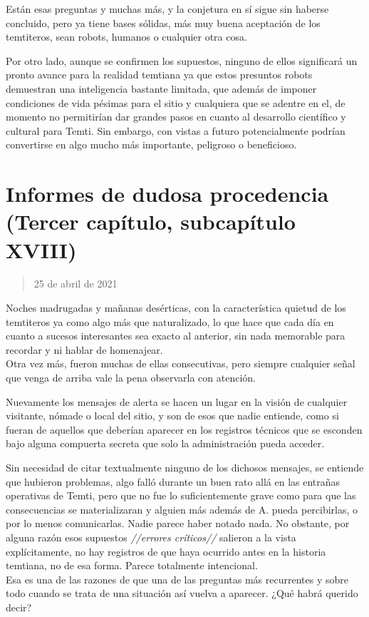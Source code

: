 \documentclass[
  spanish,
]{book}
\begin{document}
Están esas preguntas y muchas más, y la conjetura en sí sigue sin haberse concluido, pero ya tiene bases sólidas, más muy buena aceptación de los temtiteros, sean robots, humanos o cualquier otra cosa.

Por otro lado, aunque se confirmen los supuestos, ninguno de ellos significará un pronto avance para la realidad temtiana ya que estos presuntos robots demuestran una inteligencia bastante limitada, que además de imponer condiciones de vida pésimas para el sitio y cualquiera que se adentre en el, de momento no permitirían dar grandes pasos en cuanto al desarrollo científico y cultural para Temti. Sin embargo, con vistas a futuro potencialmente podrían convertirse en algo mucho más importante, peligroso o beneficioso.

\hypertarget{informes-de-dudosa-procedencia-tercer-capuxedtulo-subcapuxedtulo-xviii}{%
\section{Informes de dudosa procedencia (Tercer capítulo, subcapítulo XVIII)}\label{informes-de-dudosa-procedencia-tercer-capuxedtulo-subcapuxedtulo-xviii}}

\begin{quote}
25 de abril de 2021
\end{quote}

Noches madrugadas y mañanas desérticas, con la característica quietud de los temtiteros ya como algo más que naturalizado, lo que hace que cada día en cuanto a sucesos interesantes sea exacto al anterior, sin nada memorable para recordar y ni hablar de homenajear.\\
Otra vez más, fueron muchas de ellas consecutivas, pero siempre cualquier señal que venga de arriba vale la pena observarla con atención.

Nuevamente los mensajes de alerta se hacen un lugar en la visión de cualquier visitante, nómade o local del sitio, y son de esos que nadie entiende, como si fueran de aquellos que deberían aparecer en los registros técnicos que se esconden bajo alguna compuerta secreta que solo la administración pueda acceder.

Sin necesidad de citar textualmente ninguno de los dichosos mensajes, se entiende que hubieron problemas, algo falló durante un buen rato allá en las entrañas operativas de Temti, pero que no fue lo suficientemente grave como para que las consecuencias se materializaran y alguien más además de A. pueda percibirlas, o por lo menos comunicarlas. Nadie parece haber notado nada. No obstante, por alguna razón esos supuestos \emph{//errores críticos//} salieron a la vista explícitamente, no hay registros de que haya ocurrido antes en la historia temtiana, no de esa forma. Parece totalmente intencional.\\
Esa es una de las razones de que una de las preguntas más recurrentes y sobre todo cuando se trata de una situación así vuelva a aparecer. ¿Qué habrá querido decir?
\end{document}
